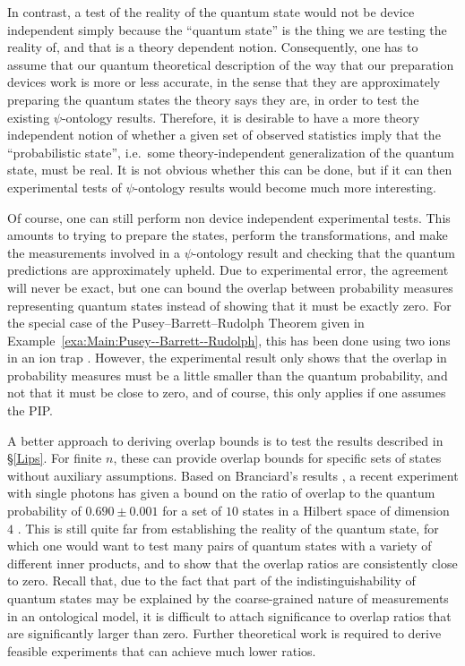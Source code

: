 \documentclass[DIV=calc,fontsize=12pt]{scrartcl} %
\theoremstyle{definition}
\theoremstyle{plain}
\begin{document}
In contrast, a test of the reality of the quantum state would not be
device independent simply because the ``quantum state'' is the thing
we are testing the reality of, and that is a theory dependent notion.
Consequently, one has to assume that our quantum theoretical
description of the way that our preparation devices work is more or
less accurate, in the sense that they are approximately preparing the
quantum states the theory says they are, in order to test the existing
$\psi$-ontology results.  Therefore, it is desirable to have a more
theory independent notion of whether a given set of observed
statistics imply that the ``probabilistic state'', i.e.\ some
theory-independent generalization of the quantum state, must be real.
It is not obvious whether this can be done, but if it can then
experimental tests of $\psi$-ontology results would become much more
interesting.

Of course, one can still perform non device independent experimental
tests.  This amounts to trying to prepare the states, perform the
transformations, and make the measurements involved in a
$\psi$-ontology result and checking that the quantum predictions are
approximately upheld.  Due to experimental error, the agreement will
never be exact, but one can bound the overlap between probability
measures representing quantum states instead of showing that it must
be exactly zero.  For the special case of the Pusey--Barrett--Rudolph Theorem given in
Example~\ref{exa:Main:Pusey--Barrett--Rudolph}, this has been done using two ions in an
ion trap \cite{Nigg2012}.  However, the experimental result only shows
that the overlap in probability measures must be a little smaller than
the quantum probability, and not that it must be close to zero, and of
course, this only applies if one assumes the PIP.

A better approach to deriving overlap bounds is to test the results
described in \S\ref{Lips}.  For finite $n$, these can provide overlap
bounds for specific sets of states without auxiliary assumptions.
Based on Branciard's results \cite{Branciard2014}, a recent experiment
with single photons has given a bound on the ratio of overlap to the
quantum probability of $0.690 \pm 0.001$ for a set of $10$ states in a
Hilbert space of dimension $4$ \cite{Ringbauer2014}.  This is still
quite far from establishing the reality of the quantum state, for
which one would want to test many pairs of quantum states with a
variety of different inner products, and to show that the overlap
ratios are consistently close to zero.  Recall that, due to the fact
that part of the indistinguishability of quantum states may be
explained by the coarse-grained nature of measurements in an
ontological model, it is difficult to attach significance to overlap
ratios that are significantly larger than zero.  Further theoretical
work is required to derive feasible experiments that can achieve much
lower ratios.
\end{document}
